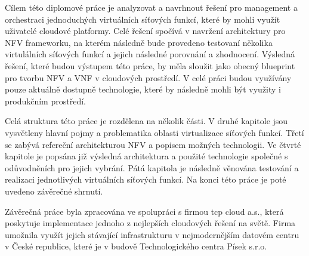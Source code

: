 Cílem této diplomové práce je analyzovat a navrhnout řešení pro management a orchestraci jednoduchých virtuálních síťových funkcí, které by mohli využít uživatelé cloudové platformy. Celé řešení spočívá v navržení architektury pro NFV frameworku, na kterém následně bude provedeno testovaní několika virtulálních síťových funkcí a jejich následné porovnání a zhodnocení. Výsledná řešení, které budou výstupem této práce, by měla sloužit jako obecný blueprint pro tvorbu NFV a VNF v cloudových prostředí. V celé práci budou využívány pouze aktuálně dostupně technologie, které by následně mohli být využity i produkčním prostředí.

Celá struktura této práce je rozdělena na několik části. V druhé kapitole jsou vysvětleny hlavní pojmy a problematika oblasti virtualizace síťových funkcí. Třetí se zabývá refereční architekturou NFV a popisem možných technologii. Ve čtvrté kapitole je popsána již výsledná architektura a použité technologie společné s odůvodněních pro jejich vybrání. Pátá kapitola je následně věnována testování a realizaci jednotlivých virtuálních síťových funkcí. Na konci této práce je poté uvedeno závěrečné shrnutí.

Závěrečná práce byla zpracována ve spolupráci s firmou tcp cloud a.s., která poskytuje implementace jednoho z nejlepších cloudových řešení na světě. Firma umožnila využít jejich stávající infrastrukturu v nejmodernějším datovém centru v České republice, které je v budově Technologického centra Písek s.r.o.